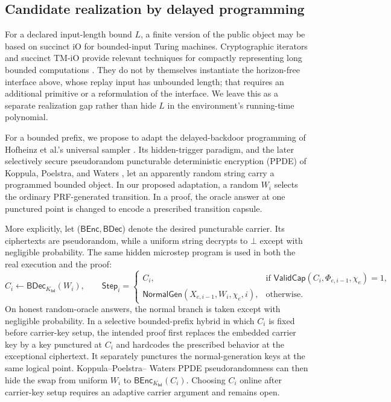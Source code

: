 \subsection{Candidate realization by delayed programming}

For a declared input-length bound $L$, a finite version of the public object
may be based on succinct iO for bounded-input Turing machines.  Cryptographic
iterators and succinct TM-iO provide relevant techniques for compactly
representing long bounded computations
\cite{KoppulaLewkoWaters2014IOTM,AnanthJainSahai2017TMIO}.  They do not by
themselves instantiate the horizon-free interface above, whose replay input
has unbounded length; that requires an additional primitive or a
reformulation of the interface.  We leave this as a separate realization gap
rather than hide $L$ in the environment's running-time polynomial.

For a bounded prefix, we propose to adapt the delayed-backdoor programming of
Hofheinz et al.'s universal sampler
\cite{HofheinzEtAl2014UniversalSamplers}.  Its hidden-trigger paradigm, and
the later selectively secure pseudorandom puncturable deterministic encryption
(PPDE) of Koppula, Poelstra, and Waters
\cite{KoppulaPoelstraWaters2017FastSamplers}, let an apparently random string
carry a programmed bounded object.  In our proposed adaptation, a random
$W_i$ selects the ordinary PRF-generated transition.  In a proof, the oracle
answer at one punctured point is changed to encode a prescribed transition
capsule.

More explicitly, let ($\mathsf{BEnc},\mathsf{BDec}$) denote the desired
puncturable carrier.  Its ciphertexts are pseudorandom, while a uniform string
decrypts to $\bot$ except with negligible probability.  The same hidden
microstep program is used in both the real execution and the proof:
\[
  C_i\leftarrow\mathsf{BDec}_{K_{\mathsf{bd}}}(W_i),
  \qquad
  \mathsf{Step}_i=
  \begin{cases}
    C_i,&\text{if }\mathsf{ValidCap}(C_i,\Phi_{e,i-1},\chi_e)=1,\\
    \mathsf{NormalGen}(X_{e,i-1},W_i,\chi_e,i),&\text{otherwise.}
  \end{cases}
  \label{eq:normal-programmed-step}
\]
On honest random-oracle answers, the normal branch is taken except with
negligible probability.  In a selective bounded-prefix hybrid in which
$C_i$ is fixed before carrier-key setup, the intended proof first replaces
the embedded carrier key by a key punctured at $C_i$ and hardcodes the
prescribed behavior at the exceptional ciphertext.  It separately punctures
the normal-generation keys at the same logical point.  Koppula--Poelstra--
Waters PPDE pseudorandomness can then hide the swap from uniform $W_i$ to
$\mathsf{BEnc}_{K_{\mathsf{bd}}}(C_i)$.  Choosing $C_i$ online after
carrier-key setup requires an adaptive carrier argument and remains open.

